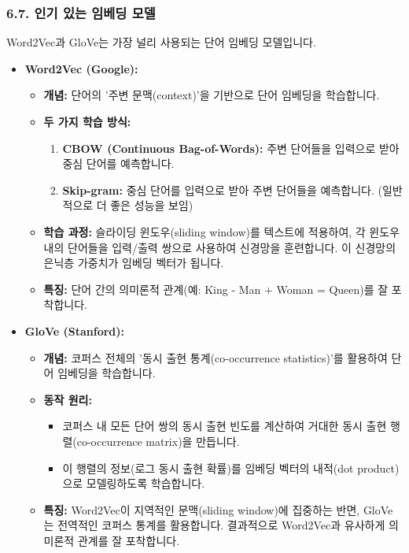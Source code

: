\documentclass[11pt,a4paper]{article}
\begin{document}
\subsubsection*{6.7. 인기 있는 임베딩 모델}
Word2Vec과 GloVe는 가장 널리 사용되는 단어 임베딩 모델입니다.

\begin{itemize}
    \item \textbf{Word2Vec (Google):}
    \begin{itemize}
        \item \textbf{개념:} 단어의 '주변 문맥(context)'을 기반으로 단어 임베딩을 학습합니다.
        \item \textbf{두 가지 학습 방식:}
            \begin{enumerate}
                \item \textbf{CBOW (Continuous Bag-of-Words):} 주변 단어들을 입력으로 받아 중심 단어를 예측합니다.
                \item \textbf{Skip-gram:} 중심 단어를 입력으로 받아 주변 단어들을 예측합니다. (일반적으로 더 좋은 성능을 보임)
            \end{enumerate}
        \item \textbf{학습 과정:} 슬라이딩 윈도우(sliding window)를 텍스트에 적용하여, 각 윈도우 내의 단어들을 입력/출력 쌍으로 사용하여 신경망을 훈련합니다. 이 신경망의 은닉층 가중치가 임베딩 벡터가 됩니다.
        \item \textbf{특징:} 단어 간의 의미론적 관계(예: King - Man + Woman = Queen)를 잘 포착합니다.
    \end{itemize}
    \item \textbf{GloVe (Stanford):}
    \begin{itemize}
        \item \textbf{개념:} 코퍼스 전체의 '동시 출현 통계(co-occurrence statistics)'를 활용하여 단어 임베딩을 학습합니다.
        \item \textbf{동작 원리:}
            \begin{itemize}
                \item 코퍼스 내 모든 단어 쌍의 동시 출현 빈도를 계산하여 거대한 동시 출현 행렬(co-occurrence matrix)을 만듭니다.
                \item 이 행렬의 정보(로그 동시 출현 확률)를 임베딩 벡터의 내적(dot product)으로 모델링하도록 학습합니다.
            \end{itemize}
        \item \textbf{특징:} Word2Vec이 지역적인 문맥(sliding window)에 집중하는 반면, GloVe는 전역적인 코퍼스 통계를 활용합니다. 결과적으로 Word2Vec과 유사하게 의미론적 관계를 잘 포착합니다.
    \end{itemize}
\end{itemize}
\end{document}
